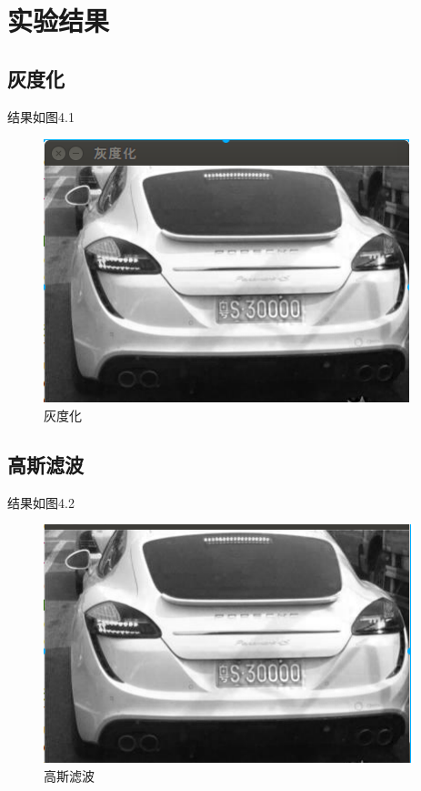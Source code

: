 \chapter{实验结果}
\section{灰度化}
结果如图4.1
\begin{figure}[h]
	\centering
	\includegraphics[scale=0.5]{figures/10.png}
	\caption{灰度化}
	\label{fig:2}
\end{figure}

\section{高斯滤波}
结果如图4.2
\begin{figure}[h]
	\centering
	\includegraphics[scale=0.5]{figures/11.png}
	\caption{高斯滤波}
	\label{fig:2}
\end{figure}

